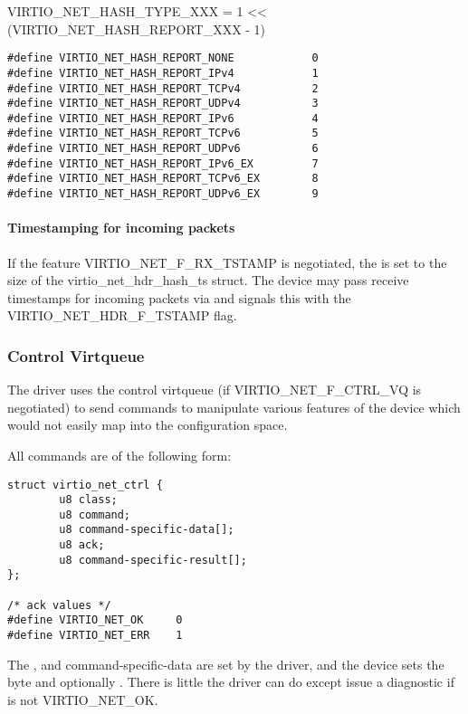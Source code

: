 VIRTIO_NET_HASH_TYPE_XXX = 1 << (VIRTIO_NET_HASH_REPORT_XXX - 1)

\begin{lstlisting}
#define VIRTIO_NET_HASH_REPORT_NONE            0
#define VIRTIO_NET_HASH_REPORT_IPv4            1
#define VIRTIO_NET_HASH_REPORT_TCPv4           2
#define VIRTIO_NET_HASH_REPORT_UDPv4           3
#define VIRTIO_NET_HASH_REPORT_IPv6            4
#define VIRTIO_NET_HASH_REPORT_TCPv6           5
#define VIRTIO_NET_HASH_REPORT_UDPv6           6
#define VIRTIO_NET_HASH_REPORT_IPv6_EX         7
#define VIRTIO_NET_HASH_REPORT_TCPv6_EX        8
#define VIRTIO_NET_HASH_REPORT_UDPv6_EX        9
\end{lstlisting}

\paragraph{Timestamping for incoming packets}
\label{sec:Device Types / Network Device / Device Operation / Processing of Incoming Packets / Timestamping for incoming packets}

If the feature VIRTIO_NET_F_RX_TSTAMP is negotiated, the  is set to the size of the virtio_net_hdr_hash_ts struct.
The device may pass receive timestamps for incoming packets via  and signals this with the
VIRTIO_NET_HDR_F_TSTAMP flag.

\subsubsection{Control Virtqueue}\label{sec:Device Types / Network Device / Device Operation / Control Virtqueue}

The driver uses the control virtqueue (if VIRTIO_NET_F_CTRL_VQ is
negotiated) to send commands to manipulate various features of
the device which would not easily map into the configuration
space.

All commands are of the following form:

\begin{lstlisting}
struct virtio_net_ctrl {
        u8 class;
        u8 command;
        u8 command-specific-data[];
        u8 ack;
        u8 command-specific-result[];
};

/* ack values */
#define VIRTIO_NET_OK     0
#define VIRTIO_NET_ERR    1
\end{lstlisting}

The ,  and command-specific-data are set by the
driver, and the device sets the  byte and optionally
. There is little the driver can
do except issue a diagnostic if  is not VIRTIO_NET_OK.

